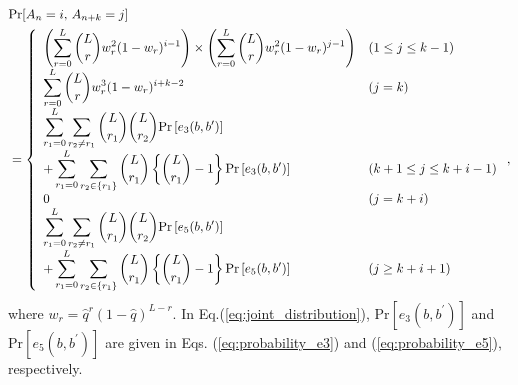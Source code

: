\documentclass[dvipdfmx,english]{ampmt} %
\begin{document}
\begin{align}\begin{split}\label{eq:joint_distribution}
  &\mathrm{Pr}[A_n=i,\,A_{n+k}=j] \\
  &= \left\{ \begin{array}{ll}
  \displaystyle\left( \sum_{r=0}^{L} \binom{L}{r}w_r^2 (1-w_r)^{i-1} \right) \times \left( \sum_{r=0}^{L} \binom{L}{r}w_r^2 (1-w_r)^{j-1} \right) & (1\leq j \leq k-1)\\
  \displaystyle\sum_{r=0}^{L} \dbinom{L}{r} w_{r}^3 (1-w_{r})^{i+k-2} & (j=k) \\
  \displaystyle\sum_{r_1=0}^{L} \sum_{r_2 \neq r_1} \dbinom{L}{r_1} \dbinom{L}{r_2} \mathrm{Pr} \left[e_3(b,b^\prime) \right] \\
  + \displaystyle\sum_{r_1=0}^{L}\sum_{r_2\in\{r_1\}} \dbinom{L}{r_1} \left\{ \dbinom{L}{r_1} -1 \right\} \mathrm{Pr} \left[e_3(b,b^\prime) \right] & (k+1 \leq j \leq k+i-1)\\
  0 & (j=k+i) \\
  \displaystyle\sum_{r_1=0}^{L} \sum_{r_2 \neq r_1} \dbinom{L}{r_1} \dbinom{L}{r_2} \mathrm{Pr} \left[e_5(b,b^\prime) \right] \\
  \displaystyle+ \sum_{r_1=0}^{L}\sum_{r_2\in\{r_1\}} \dbinom{L}{r_1} \left\{ \dbinom{L}{r_1} -1 \right\} \mathrm{Pr} \left[e_5(b,b^\prime) \right] & (j \geq k+i+1)
  \end{array}\right.,
\end{split}\end{align}
where $w_r=\hat{q}^r(1-\hat{q})^{L-r}$. In Eq.(\ref{eq:joint_distribution}), $\mathrm{Pr} \left[e_3(b,b^\prime) \right]$ and $\mathrm{Pr} \left[e_5(b,b^\prime) \right]$ are given in Eqs. (\ref{eq:probability_e3}) and (\ref{eq:probability_e5}), respectively.
\end{document}
